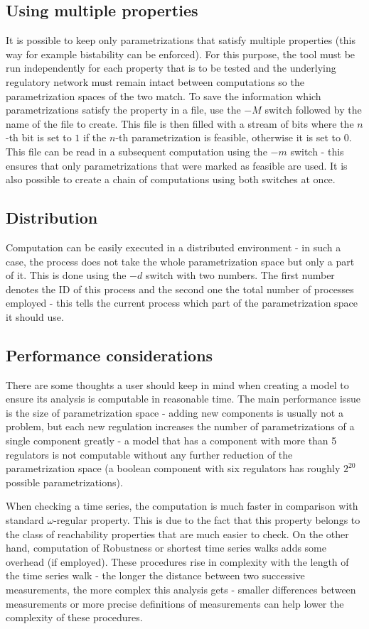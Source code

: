 \documentclass[12pt]{article}
\begin{document}
\subsection{Using multiple properties}
It is possible to keep only parametrizations that satisfy multiple properties (this way for example bistability can be enforced). 
For this purpose, the tool must be run independently for each property that is to be tested and the underlying regulatory network must remain intact between computations so the parametrization spaces of the two match.
To save the information which parametrizations satisfy the property in a file, use the $-M$ switch followed by the name of the file to create. 
This file is then filled with a stream of bits where the $n$-th bit is set to $1$ if the $n$-th parametrization is feasible, otherwise it is set to $0$. This file can be read in a subsequent computation using the $-m$ switch - this ensures that only parametrizations that were marked as feasible are used.
It is also possible to create a chain of computations using both switches at once.

\subsection{Distribution}
Computation can be easily executed in a distributed environment - in such a case, the process does not take the whole parametrization space but only a part of it. This is done using the $-d$ switch with two numbers. The first number denotes the ID of this process and the second one the total number of processes employed - this tells the current process which part of the parametrization space it should use.

\subsection{Performance considerations}
There are some thoughts a user should keep in mind when creating a model to ensure its analysis is computable in reasonable time. The main performance issue is the size of parametrization space - adding new components is usually not a problem, but each new regulation increases the number of parametrizations of a single component greatly - a model that has a component with more than 5 regulators is not computable without any further reduction of the parametrization space (a boolean component with six regulators has roughly $2^{20}$ possible parametrizations). 

When checking a time series, the computation is much faster in comparison with standard $\omega$-regular property. This is due to the fact that this property belongs to the class of reachability properties that are much easier to check. On the other hand, computation of \textrm{Robustness} or shortest time series walks adds some overhead (if employed). These procedures rise in complexity with the length of the time series walk - the longer the distance between two successive measurements, the more complex this analysis gets - smaller differences between measurements or more precise definitions of measurements can help lower the complexity of these procedures.



\end{document}
